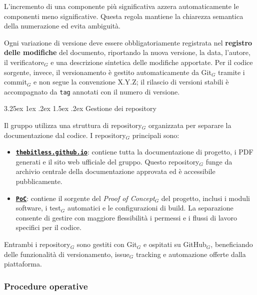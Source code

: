 \documentclass[a4paper, 10pt]{article}
\makeatletter
\renewcommand\paragraph{\@startsection{paragraph}{4}{\z@}%
  {3.25ex \@plus1ex \@minus .2ex}%
  {1.5ex \@plus .2ex}%
  {\normalfont\normalsize\bfseries}}
\makeatother
\begin{document}
L'incremento di una componente più significativa azzera automaticamente le componenti meno significative. Questa regola mantiene la chiarezza semantica della numerazione ed evita ambiguità.

Ogni variazione di versione deve essere obbligatoriamente registrata nel \textbf{registro delle modifiche} del documento, riportando la nuova versione, la data, l'autore, il verificatore$_G$ e una descrizione sintetica delle modifiche apportate. Per il codice sorgente, invece, il versionamento è gestito automaticamente da Git$_G$ tramite i commit$_G$ e non segue la convenzione X.Y.Z; il rilascio di versioni stabili è accompagnato da \texttt{tag} annotati con il numero di versione.

\paragraph{Gestione dei repository}

Il gruppo utilizza una struttura di repository$_G$ organizzata per separare la documentazione dal codice. I repository$_G$ principali sono:
\begin{itemize}
    \item \textbf{\href{https://github.com/thebitless-group-swe/thebitless.github.io/tree/main}{\texttt{thebitless.github.io}}}: contiene tutta la documentazione di progetto, i PDF generati e il sito web ufficiale del gruppo. Questo repository$_G$ funge da archivio centrale della documentazione approvata ed è accessibile pubblicamente.
    \item \textbf{\href{https://github.com/thebitless-group-swe/PoC}{\texttt{PoC}}}: contiene il sorgente del \emph{Proof of Concept}$_G$ del progetto, inclusi i moduli software, i test$_G$ automatici e le configurazioni di build. La separazione consente di gestire con maggiore flessibilità i permessi e i flussi di lavoro specifici per il codice.
\end{itemize}

Entrambi i repository$_G$ sono gestiti con Git$_G$ e ospitati su GitHub$_G$, beneficiando delle funzionalità di versionamento, issue$_G$ tracking e automazione offerte dalla piattaforma.

\subsubsection{Procedure operative}
\label{subsubsec:procedure_configurazione}
\end{document}
